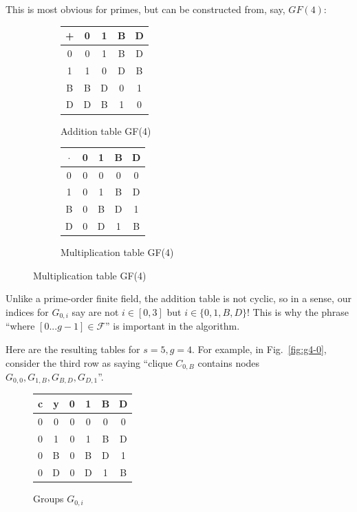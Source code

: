 \documentclass[11pt, oneside]{article} 	%
\begin{document}
This is most obvious for primes, but can be constructed from, say, $GF(4):$

\begin{figure}[!htb]
\centering
\begin{subfigure}{.3\textwidth}
 \centering
 \begin{tabular}{c | c c c c}
   + & 0 & 1 & B & D \\
\hline
   0 & 0 & 1 & B & D \\
   1 & 1 & 0 & D & B \\
   B & B & D & 0 & 1 \\
   D & D & B & 1 & 0 \\
   \end{tabular}
 \caption{Addition table GF(4)}
\label{fig:gf-add}
\end{subfigure}
\begin{subfigure}{.3\textwidth}
 \centering
\begin{tabular}{c | c c c c}
   $\cdot$ & 0 & 1 & B & D \\
\hline
   0 & 0 & 0 & 0 & 0 \\
   1 & 0 & 1 & B & D \\
   B & 0 & B & D & 1 \\
   D & 0 & D & 1 & B \\
\end{tabular}
 \caption{Multiplication table GF(4)}
\label{fig:gf-mult}
\end{subfigure}
\end{figure}

Unlike a prime-order finite field, the addition table is not cyclic, so in a sense, our indices for $G_{0,i}$ say are not $i \in [0, 3]$ but $i \in \{0,1,B,D\}$! This is why the phrase ``where $[0...g-1] \in \mathcal{F}$'' is important in the algorithm.

Here are the resulting tables for $s=5, g=4$. For example, in Fig.~\ref{fig:g4-0}, consider the third row as saying ``clique $C_{0,B}$ contains nodes $G_{0,0}, G_{1,B}, G_{B,D}, G_{D,1}$''.

\begin{figure}[!htb]
\centering
 \begin{tabular}{c c | c c c c}
   c & y & 0 & 1 & B & D \\
\hline
   0 & 0 & 0 & 0 & 0 & 0 \\
   0 & 1 & 0 & 1 & B & D \\
   0 & B & 0 & B & D & 1 \\
   0 & D & 0 & D & 1 & B \\
   \end{tabular}
\caption{Groups $G_{0,i}$}
\label{fig:gf4-0}
\end{figure}
\end{document}
